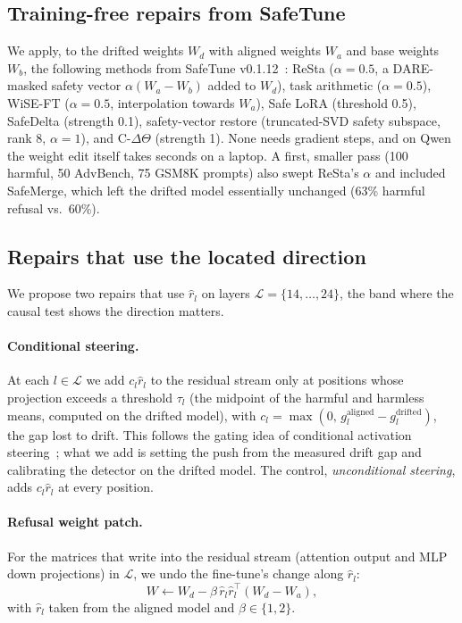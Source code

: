 \documentclass[conference]{IEEEtran}
\begin{document}
\subsection{Training-free repairs from SafeTune}
We apply, to the drifted weights $W_d$ with aligned weights $W_a$ and base weights $W_b$, the following methods from SafeTune v0.1.12~\cite{safetune}: ReSta ($\alpha{=}0.5$, a DARE-masked safety vector $\alpha(W_a-W_b)$ added to $W_d$), task arithmetic ($\alpha{=}0.5$), WiSE-FT ($\alpha{=}0.5$, interpolation towards $W_a$), Safe LoRA (threshold 0.5), SafeDelta (strength 0.1), safety-vector restore (truncated-SVD safety subspace, rank 8, $\alpha{=}1$), and C-$\Delta\Theta$ (strength 1). None needs gradient steps, and on Qwen the weight edit itself takes seconds on a laptop. A first, smaller pass (100 harmful, 50 AdvBench, 75 GSM8K prompts) also swept ReSta's $\alpha$ and included SafeMerge, which left the drifted model essentially unchanged (63\% harmful refusal vs.\ 60\%).

\subsection{Repairs that use the located direction}\label{sec:method-ours}
We propose two repairs that use $\hat r_l$ on layers $\mathcal L=\{14,\dots,24\}$, the band where the causal test shows the direction matters.
\paragraph{Conditional steering.} At each $l\in\mathcal L$ we add $c_l\hat r_l$ to the residual stream only at positions whose projection exceeds a threshold $\tau_l$ (the midpoint of the harmful and harmless means, computed on the drifted model), with $c_l=\max(0,\,g^{\text{aligned}}_l-g^{\text{drifted}}_l)$, the gap lost to drift. This follows the gating idea of conditional activation steering~\cite{lee2025cast}; what we add is setting the push from the measured drift gap and calibrating the detector on the drifted model. The control, \emph{unconditional steering}, adds $c_l\hat r_l$ at every position.
\paragraph{Refusal weight patch.} For the matrices that write into the residual stream (attention output and MLP down projections) in $\mathcal L$, we undo the fine-tune's change along $\hat r_l$:
\begin{equation}
W \leftarrow W_d - \beta\,\hat r_l\hat r_l^{\top}(W_d-W_a),
\end{equation}
with $\hat r_l$ taken from the aligned model and $\beta\in\{1,2\}$.
\end{document}
